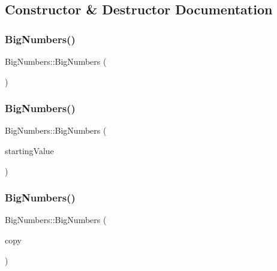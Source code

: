 \subsection{Constructor \& Destructor Documentation}
\mbox{\label{class_big_numbers_af3dd82883f10f3473ac83280f26b0ad8}} 
\subsubsection{\texorpdfstring{Big\+Numbers()}{BigNumbers()}\hspace{0.1cm}{\footnotesize\ttfamily [1/3]}}
{\footnotesize\ttfamily Big\+Numbers\+::\+Big\+Numbers (\begin{DoxyParamCaption}{ }\end{DoxyParamCaption})}

\mbox{\label{class_big_numbers_ae05f731eabe0a6a24e6a2a446bc6e494}} 
\subsubsection{\texorpdfstring{Big\+Numbers()}{BigNumbers()}\hspace{0.1cm}{\footnotesize\ttfamily [2/3]}}
{\footnotesize\ttfamily Big\+Numbers\+::\+Big\+Numbers (\begin{DoxyParamCaption}\item[{int}]{starting\+Value }\end{DoxyParamCaption})}

\mbox{\label{class_big_numbers_a5722d1b8b8e1b793bca0aa8da14e0c64}} 
\subsubsection{\texorpdfstring{Big\+Numbers()}{BigNumbers()}\hspace{0.1cm}{\footnotesize\ttfamily [3/3]}}
{\footnotesize\ttfamily Big\+Numbers\+::\+Big\+Numbers (\begin{DoxyParamCaption}\item[{const \mbox{\hyperlink{class_big_numbers}{Big\+Numbers}} \&}]{copy }\end{DoxyParamCaption})}



